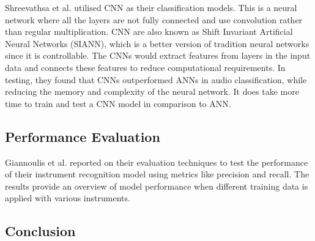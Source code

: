 Shreevathsa et al. utilised CNN as their classification models. This is a neural network where all the layers are not fully connected and use convolution rather than regular multiplication. CNN are also known as Shift Invariant Artificial Neural Networks (SIANN), which is a better version of tradition neural networks since it is controllable. The CNNs would extract features from layers in the input data and connects these features to reduce computational requirements. In testing, they found that CNNs outperformed ANNs in audio classification, while reducing the memory and complexity of the neural network. It does take more time to train and test a CNN model in comparison to ANN. 

\subsection{Performance Evaluation}

Giannoulis et al. reported on their evaluation techniques to test the performance of their instrument recognition model using metrics like precision and recall. The results provide an overview of model performance when different training data is applied with various instruments. 

\subsection{Conclusion}

% 
% 
